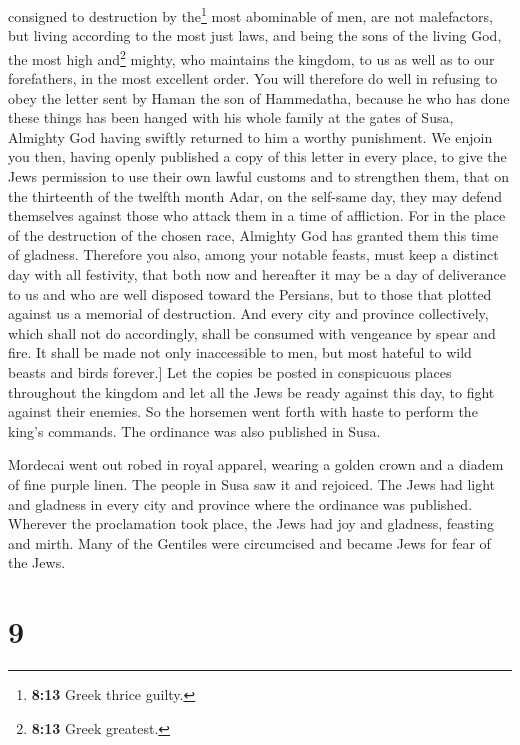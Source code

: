 consigned to destruction by the\footnote{\textbf{8:13} Greek thrice
  guilty.} most abominable of men, are not malefactors, but living
according to the most just laws, and being the sons of the living God,
the most high and\footnote{\textbf{8:13} Greek greatest.} mighty, who
maintains the kingdom, to us as well as to our forefathers, in the most
excellent order. You will therefore do well in refusing to obey the
letter sent by Haman the son of Hammedatha, because he who has done
these things has been hanged with his whole family at the gates of Susa,
Almighty God having swiftly returned to him a worthy punishment. We
enjoin you then, having openly published a copy of this letter in every
place, to give the Jews permission to use their own lawful customs and
to strengthen them, that on the thirteenth of the twelfth month Adar, on
the self-same day, they may defend themselves against those who attack
them in a time of affliction. For in the place of the destruction of the
chosen race, Almighty God has granted them this time of gladness.
Therefore you also, among your notable feasts, must keep a distinct day
with all festivity, that both now and hereafter it may be a day of
deliverance to us and who are well disposed toward the Persians, but to
those that plotted against us a memorial of destruction. And every city
and province collectively, which shall not do accordingly, shall be
consumed with vengeance by spear and fire. It shall be made not only
inaccessible to men, but most hateful to wild beasts and birds
forever.{]} Let the copies be posted in conspicuous places throughout
the kingdom and let all the Jews be ready against this day, to fight
against their enemies.  So the horsemen went forth with
haste to perform the king's commands. The ordinance was also published
in Susa.

 Mordecai went out robed in royal apparel, wearing a
golden crown and a diadem of fine purple linen. The people in Susa saw
it and rejoiced.  The Jews had light and gladness
 in every city and province where the ordinance was
published. Wherever the proclamation took place, the Jews had joy and
gladness, feasting and mirth. Many of the Gentiles were circumcised and
became Jews for fear of the Jews.

\hypertarget{section-8}{%
\section{9}\label{section-8}}

